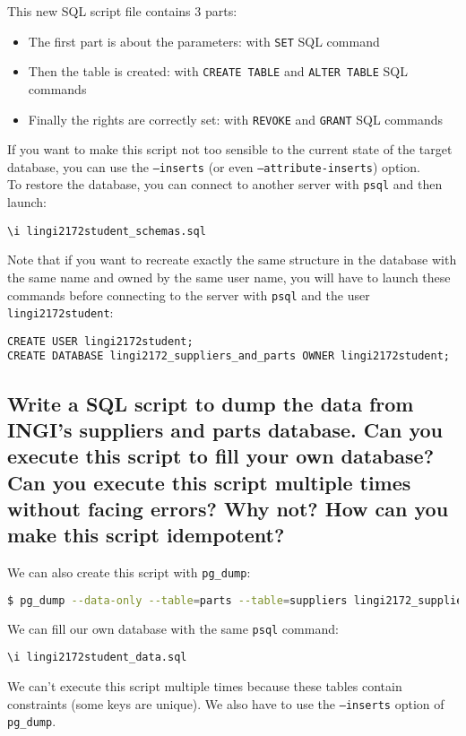 \documentclass[a4paper,11pt]{article}
\begin{document}
This new SQL script file contains 3 parts:
\begin{itemize}
	\item The first part is about the parameters: with \texttt{SET} SQL command
	\item Then the table is created: with \texttt{CREATE TABLE} and \texttt{ALTER TABLE} SQL commands
	\item Finally the rights are correctly set: with \texttt{REVOKE} and \texttt{GRANT} SQL commands
\end{itemize}

If you want to make this script not too sensible to the current state of the target database, you can use the \texttt{--inserts} (or even \texttt{--attribute-inserts}) option.\\

To restore the database, you can connect to another server with \texttt{psql} and then launch:
\begin{lstlisting}
\i lingi2172student_schemas.sql
\end{lstlisting}
Note that if you want to recreate exactly the same structure in the database with the same name and owned by the same user name, you will have to launch these commands before connecting to the server with \texttt{psql} and the user \texttt{lingi2172student}:
\begin{lstlisting}
CREATE USER lingi2172student;
CREATE DATABASE lingi2172_suppliers_and_parts OWNER lingi2172student;
\end{lstlisting}


\subsection{Write a SQL script to dump the data from INGI’s suppliers and parts database. Can you execute this script to fill your own database? Can you execute this script multiple times without facing errors? Why not? How can you make this script idempotent?}
We can also create this script with \texttt{pg\_dump}:
\begin{lstlisting}[language=bash]
	$ pg_dump --data-only --table=parts --table=suppliers lingi2172_suppliers_and_parts -h attma.info.ucl.ac.be -U lingi2172student > lingi2172student_data.sql
\end{lstlisting}
We can fill our own database with the same \texttt{psql} command:
\begin{lstlisting}
\i lingi2172student_data.sql
\end{lstlisting}
We can't execute this script multiple times because these tables contain constraints (some keys are unique). We also have to use the \texttt{--inserts} option of \texttt{pg\_dump}.
\end{document}
